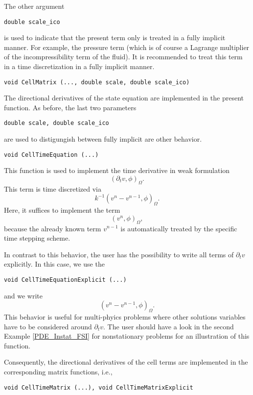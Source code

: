 The other argument
\begin{verbatim}
double scale_ico
\end{verbatim} 
is used to indicate that the present term 
only is treated in a fully implicit manner. 
For example, the pressure term (which is of course
a Lagrange multiplier of the incompressibility 
term of the fluid). It is recommended to treat 
this term in a time discretization in a fully 
implicit manner. 

\begin{verbatim}
void CellMatrix (..., double scale, double scale_ico)
\end{verbatim}
The directional derivatives of the state equation
are implemented in the present function. As before,
the last two parameters
\begin{verbatim}
double scale, double scale_ico
\end{verbatim} 
are used to distigungish between fully implicit 
are other behavior. 

\begin{verbatim}
void CellTimeEquation (...) 
\end{verbatim}
This function is used to implement the 
time derivative in weak formulation 
\begin{equation*}
(\partial_t v, \phi)_{\Omega}.
\end{equation*}
This term is time discretized via
\begin{equation*}
k^{-1} (v^n - v^{n-1} , \phi)_{\Omega}. 
\end{equation*}
Here, it suffices to implement the term
\begin{equation*}
(v^n, \phi)_{\Omega},
\end{equation*}
because the already known term $v^{n-1}$ is 
automatically treated by the specific time
stepping scheme. 

In contrast to this behavior, the user 
has the possibility to write all terms of 
$\partial_t v$ explicitly. In this case, we 
use the 
\begin{verbatim}
void CellTimeEquationExplicit (...) 
\end{verbatim}
and we write 
\begin{equation*}
(v^n - v^{n-1}, \phi)_{\Omega}.
\end{equation*}
This behavior is useful for multi-phyics problems
where other solutions variables have to be considered
around $\partial_t v$. The user should have a look 
in the second Example 
\ref{PDE_Instat_FSI} for nonstationary problems 
for an illustration
of this function. 

Consequently, the directional derivatives of the 
cell terms are implemented in the corresponding
matrix functions, i.e., 
\begin{verbatim}
void CellTimeMatrix (...), void CellTimeMatrixExplicit 
\end{verbatim}


